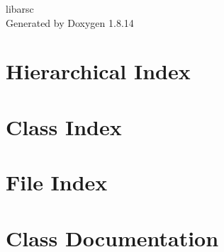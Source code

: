 \documentclass[twoside]{book}
\newcommand{\+}{\discretionary{\mbox{\scriptsize$\hookleftarrow$}}{}{}}
\newcommand{\clearemptydoublepage}{%
  \newpage{\pagestyle{empty}\cleardoublepage}%
}
\begin{document}
\hypersetup{pageanchor=false,
             bookmarksnumbered=true,
             pdfencoding=unicode
            }
\begin{titlepage}
\vspace*{7cm}
\begin{center}%
{\Large libarsc }\\
\vspace*{1cm}
{\large Generated by Doxygen 1.8.14}\\
\end{center}
\end{titlepage}
\clearemptydoublepage
{}
\tableofcontents
\clearemptydoublepage
{}
\hypersetup{pageanchor=true}

\chapter{Hierarchical Index}

\chapter{Class Index}

\chapter{File Index}

\chapter{Class Documentation}

































\end{document}
